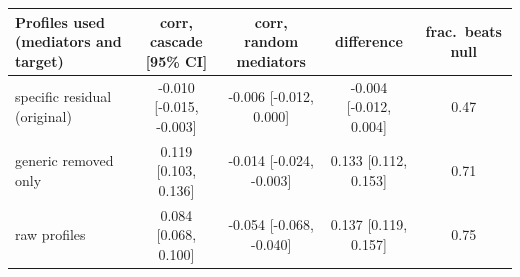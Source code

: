 \begin{tabular}{lcccc}
\toprule
Profiles used (mediators and target) & corr, cascade [95\% CI] & corr, random mediators & difference & frac.\ beats null \\
\midrule
specific residual (original) & -0.010 [-0.015, -0.003] & -0.006 [-0.012, 0.000] & -0.004 [-0.012, 0.004] & 0.47 \\
generic removed only & 0.119 [0.103, 0.136] & -0.014 [-0.024, -0.003] & 0.133 [0.112, 0.153] & 0.71 \\
raw profiles & 0.084 [0.068, 0.100] & -0.054 [-0.068, -0.040] & 0.137 [0.119, 0.157] & 0.75 \\
\bottomrule
\end{tabular}